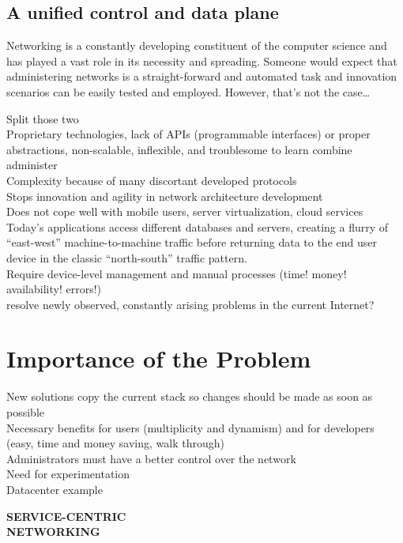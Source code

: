 \documentclass[12pt,a4paper,oneside]{article}
\begin{document}
\newpage
\subsection{A unified control and data plane}
Networking is a constantly developing constituent of the computer science and has played a vast role in its necessity and spreading.
Someone would expect that administering networks is a straight-forward and automated task and innovation scenarios can be easily tested and employed.
However, that's not the case\ldots \\
\indent 


Split those two
\\Proprietary technologies, lack of APIs (programmable interfaces) or proper abstractions, non-scalable, inflexible, and troublesome to learn combine administer
\\Complexity because of many discortant developed protocols
\\Stops innovation and agility in network architecture development
\\Does not cope well with mobile users, server virtualization, cloud services
\\Today’s applications access different databases and servers, creating a flurry of “east-west” machine-to-machine traffic before returning data to the end user device in the classic “north-south” traffic pattern.
\\Require device-level management and manual processes (time! money! availability! errors!)
\\resolve newly observed, constantly arising problems in the current Internet?


\newpage
\section{Importance of the Problem}
New solutions copy the current stack so changes should be made as soon as possible
\\Necessary benefits for users (multiplicity and dynamism) and for developers (easy, time and money saving, walk through)
\\Administrators must have a better control over the network
\\Need for experimentation
\\Datacenter example


\newpage
\thispagestyle{empty}
{}
{\Huge \bf \noindent SERVICE-CENTRIC\\[0.2cm] NETWORKING}
\newpage
\end{document}
